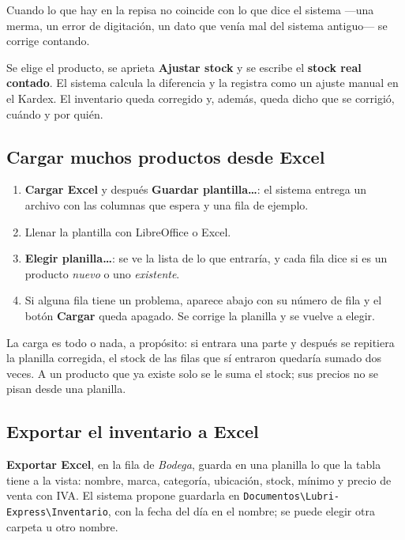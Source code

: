 \documentclass[11pt,a4paper]{article}
\begin{document}
Cuando lo que hay en la repisa no coincide con lo que dice el sistema —una
merma, un error de digitación, un dato que venía mal del sistema antiguo— se
corrige contando.


Se elige el producto, se aprieta \textbf{Ajustar stock} y se escribe el
\textbf{stock real contado}. El sistema calcula la diferencia y la registra como
un ajuste manual en el Kardex. El inventario queda corregido y, además, queda
dicho que se corrigió, cuándo y por quién.

\subsection{Cargar muchos productos desde Excel}


\begin{enumerate}
  \item \textbf{Cargar Excel} y después \textbf{Guardar plantilla\ldots}: el
        sistema entrega un archivo con las columnas que espera y una fila de
        ejemplo.
  \item Llenar la plantilla con LibreOffice o Excel.
  \item \textbf{Elegir planilla\ldots}: se ve la lista de lo que entraría, y
        cada fila dice si es un producto \emph{nuevo} o uno \emph{existente}.
  \item Si alguna fila tiene un problema, aparece abajo con su número de fila y
        el botón \textbf{Cargar} queda apagado. Se corrige la planilla y se
        vuelve a elegir.
\end{enumerate}

La carga es todo o nada, a propósito: si entrara una parte y después se repitiera
la planilla corregida, el stock de las filas que sí entraron quedaría sumado dos
veces. A un producto que ya existe solo se le suma el stock; sus precios no se
pisan desde una planilla.

\subsection{Exportar el inventario a Excel}

\textbf{Exportar Excel}, en la fila de \emph{Bodega}, guarda en una planilla lo
que la tabla tiene a la vista: nombre, marca, categoría, ubicación, stock,
mínimo y precio de venta con IVA. El sistema propone guardarla en
\texttt{Documentos\textbackslash Lubri-Express\textbackslash Inventario}, con la
fecha del día en el nombre; se puede elegir otra carpeta u otro nombre.
\end{document}

